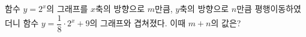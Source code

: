 함수 $y=2^{x}$의 그래프를 $x$축의 방향으로 $m$만큼, $y$축의 방향으로 $n$만큼 평행이동하였더니 함수 $y=\dfrac{1}{8}\cdot2^{x}+9$의 그래프와 겹쳐졌다. 이때 $m+n$의 값은?
